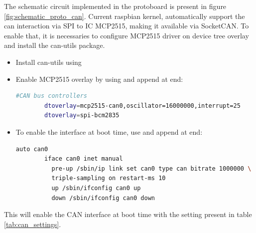 The schematic circuit implemented in the protoboard is present in figure \ref{fig:schematic_proto_can}.
Current raspbian kernel, automatically support the can interaction via \gls{SPI} to \gls{IC} MCP2515, making it available via SocketCAN. To enable that, it is necessaries to configure MCP2515 driver on device tree overlay and install the can-utils package.
\begin{itemize}
	\tightlist
	\item Install can-utils using 
	\item Enable MCP2515 overlay by using  and append at end:
	\begin{lstlisting}[label={lst:boot_settings},frame=none,language=bash,backgroundcolor=\color{gray!15},numbers=none,basicstyle=\ttfamily]
		#CAN bus controllers
		dtoverlay=mcp2515-can0,oscillator=16000000,interrupt=25
		dtoverlay=spi-bcm2835
\end{lstlisting}
	\item To enable the interface at boot time, use  and append at end:
	\begin{minipage}{\linewidth} %
\begin{lstlisting}[frame=none,language=bash,backgroundcolor=\color{gray!15},numbers=none,		basicstyle=\ttfamily]
		auto can0
		iface can0 inet manual
		  pre-up /sbin/ip link set can0 type can bitrate 1000000 \ 
		  triple-sampling on restart-ms 10
		  up /sbin/ifconfig can0 up
		  down /sbin/ifconfig can0 down
\end{lstlisting}
	\end{minipage}
\end{itemize}
This will enable the \gls{CAN} interface at boot time with the setting present in table \ref{tab:can_settings}.



